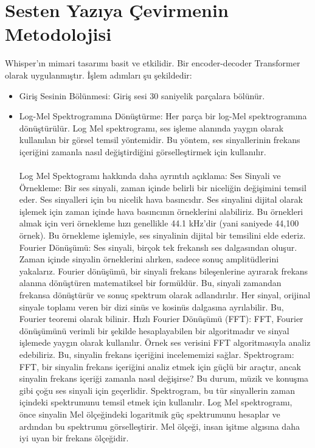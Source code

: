 \documentclass{article}
\begin{document}
	\section{Sesten Yazıya Çevirmenin Metodolojisi}
	Whisper’ın mimari tasarımı basit ve etkilidir. Bir encoder-decoder Transformer olarak uygulanmıştır. İşlem adımları şu şekildedir:
	\begin{itemize}
		\item Giriş Sesinin Bölünmesi: Giriş sesi 30 saniyelik parçalara bölünür.
		\item Log-Mel Spektrogramına Dönüştürme: Her parça bir log-Mel spektrogramına dönüştürülür.
		Log Mel spektrogramı, ses işleme alanında yaygın olarak kullanılan bir görsel temsil yöntemidir. Bu yöntem, ses sinyallerinin frekans içeriğini zamanla nasıl değiştirdiğini görselleştirmek için kullanılır. \\ \\ Log Mel Spektogramı hakkında daha ayrıntılı açıklama:
		\subitem Ses Sinyali ve Örnekleme: Bir ses sinyali, zaman içinde belirli bir niceliğin değişimini temsil eder. Ses sinyalleri için bu nicelik hava basıncıdır. Ses sinyalini dijital olarak işlemek için zaman içinde hava basıncının örneklerini alabiliriz. Bu örnekleri almak için veri örnekleme hızı genellikle 44.1 kHz’dir (yani saniyede 44,100 örnek). Bu örnekleme işlemiyle, ses sinyalinin dijital bir temsilini elde ederiz.
		\subitem Fourier Dönüşümü: Ses sinyali, birçok tek frekanslı ses dalgasından oluşur. Zaman içinde sinyalin örneklerini alırken, sadece sonuç amplitüdlerini yakalarız. Fourier dönüşümü, bir sinyali frekans bileşenlerine ayırarak frekans alanına dönüştüren matematiksel bir formüldür. Bu, sinyali zamandan frekansa dönüştürür ve sonuç spektrum olarak adlandırılır. Her sinyal, orijinal sinyale toplamı veren bir dizi sinüs ve kosinüs dalgasına ayrılabilir. Bu, Fourier teoremi olarak bilinir.
		\subitem Hızlı Fourier Dönüşümü (FFT): FFT, Fourier dönüşümünü verimli bir şekilde hesaplayabilen bir algoritmadır ve sinyal işlemede yaygın olarak kullanılır. Örnek ses verisini FFT algoritmasıyla analiz edebiliriz. Bu, sinyalin frekans içeriğini incelememizi sağlar.
		\subitem Spektrogram: FFT, bir sinyalin frekans içeriğini analiz etmek için güçlü bir araçtır, ancak sinyalin frekans içeriği zamanla nasıl değişirse? Bu durum, müzik ve konuşma gibi çoğu ses sinyali için geçerlidir. Spektrogram, bu tür sinyallerin zaman içindeki spektrumunu temsil etmek için kullanılır. Log Mel spektrogramı, önce sinyalin Mel ölçeğindeki logaritmik güç spektrumunu hesaplar ve ardından bu spektrumu görselleştirir. Mel ölçeği, insan işitme algısına daha iyi uyan bir frekans ölçeğidir.

\end{itemize}
\end{document}
